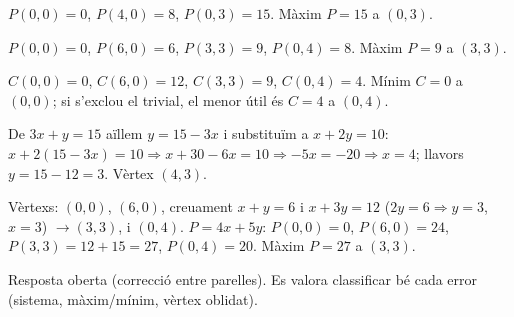 \begin{solucions}
\begin{sollist}
  \item $P(0,0)=0$, $P(4,0)=8$, $P(0,3)=15$. Màxim $P=15$ a $(0,3)$.
  \item $P(0,0)=0$, $P(6,0)=6$, $P(3,3)=9$, $P(0,4)=8$. Màxim $P=9$ a $(3,3)$.
  \item $C(0,0)=0$, $C(6,0)=12$, $C(3,3)=9$, $C(0,4)=4$. Mínim $C=0$ a $(0,0)$; si
        s'exclou el trivial, el menor útil és $C=4$ a $(0,4)$.
  \item De $3x+y=15$ aïllem $y=15-3x$ i substituïm a $x+2y=10$:
        $x+2(15-3x)=10\Rightarrow x+30-6x=10\Rightarrow -5x=-20\Rightarrow x=4$;
        llavors $y=15-12=3$. Vèrtex $(4,3)$.
  \item Vèrtexs: $(0,0)$, $(6,0)$, creuament $x+y=6$ i $x+3y=12$ ($2y=6\Rightarrow y=3$,
        $x=3$) $\rightarrow (3,3)$, i $(0,4)$. $P=4x+5y$: $P(0,0)=0$, $P(6,0)=24$,
        $P(3,3)=12+15=27$, $P(0,4)=20$. Màxim $P=27$ a $(3,3)$.
  \item Resposta oberta (correcció entre parelles). Es valora classificar bé cada
        error (sistema, màxim/mínim, vèrtex oblidat).
\end{sollist}
\end{solucions}
